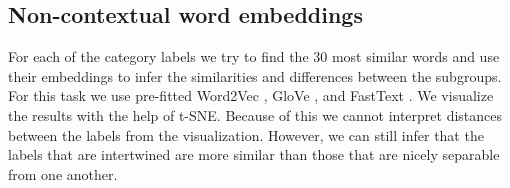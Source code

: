 \documentclass[fleqn,moreauthors,10pt]{ds_report}
\begin{document}
\subsection{Non-contextual word embeddings}
For each of the category labels we try to find the $30$ most similar words and use their embeddings to infer the similarities and differences between the subgroups. For this task we use pre-fitted Word2Vec \cite{mikolov2013efficient, mikolov2013distributed}, GloVe \cite{pennington2014glove}, and FastText \cite{bojanowski2016enriching}. We visualize the results with the help of t-SNE. Because of this we cannot interpret distances between the labels from the visualization. However, we can still infer that the labels that are intertwined are more similar than those that are nicely separable from one another. %

\end{document}
